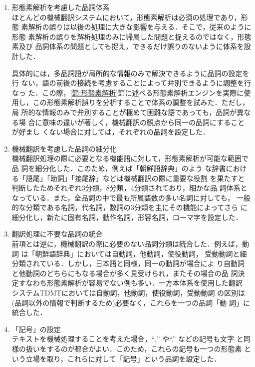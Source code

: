 \begin{enumerate}
\item 形態素解析を考慮した品詞体系\\
ほとんどの機械翻訳システムにおいて，形態素解析は必須の処理であり，形態
素解析の誤りは以後の処理に大きな影響を与える．そこで，従来のように形態
素解析の誤りを解析処理のみに帰属した問題と捉えるのではなく，形態素及び
品詞体系の問題としても捉え，できるだけ誤りのないように体系を設計した．

具体的には，多品詞語が局所的な情報のみで解決できるように品詞の設定を行
ない，語の前後の接続を考慮することによって弁別できるように調整を行なっ
た．この際，\ref{節:形態素解析}節に述べる形態素解析エンジンを実際に使
用し，この形態素解析誤りを分析することで体系の調整を試みた．ただし，局
所的な情報のみで弁別することが極めて困難な語であっても，品詞が異なる場
合に意味の違いが著しく，機械翻訳の観点から同一の品詞にすることが好まし
くない場合に対しては，それぞれの品詞を設定した．

\item 機械翻訳を考慮した品詞の細分化\\
機械翻訳処理の際に必要となる機能語に対して，形態素解析が可能な範囲で品
詞を細分化した．このため，例えば「朝鮮語辞典」\cite{朝鮮語辞典}のよう
な辞書における「語尾」「助詞」「接尾辞」などは機械翻訳の際に重要な役割
を果たすと判断したためそれぞれ3分類，8分類，4分類されており，細かな品
詞体系となっている．また，全品詞の中で最も所属語数の多い名詞に対しても，
一般的な分類である名詞，代名詞，数詞の3分類を主にその機能によってさら
に細分化し，新たに固有名詞，動作名詞，形容名詞，ローマ字を設定した．

\item 翻訳処理に不要な品詞の統合\\
前項とは逆に，機械翻訳の際に必要のない品詞分類は統合した．例えば，動詞
は「朝鮮語辞典」\cite{朝鮮語辞典}においては自動詞，他動詞，使役動詞，
受動動詞と細分類されている．しかし，日本語と同様，同一の動詞が場合によ
り自動詞と他動詞のどちらにもなる場合が多く見受けられ，またその場合の品
詞決定すなわち形態素解析が容易でない例も多い．一方本体系を使用した翻訳
システムTDMT\cite{古瀬99}においては自動詞，他動詞，使役動詞，受動動詞
の区別は(品詞以外の情報で判断するため)必要なく，これらを一つの品詞「動
詞」に統合した．

\item 「記号」の設定\\
テキストを機械処理することを考えた場合，``,'' や``.'' などの記号も文字
と同様の扱いをするのが都合がよい．このため，これらの記号も一つの形態素
という立場を取り，これらに対して「記号」という品詞を設定した．

\end{enumerate}

